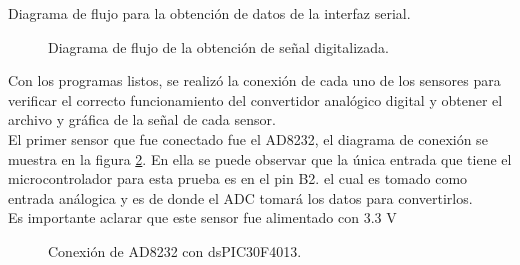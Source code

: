 Diagrama de flujo para la obtención de datos de la interfaz serial.
	\begin{figure}[htbp!]
		\centering
		\caption{Diagrama de flujo de la obtención de señal digitalizada.}
		\label{fig:FlujoSerial}
	\end{figure}
\pagebreak
		
Con los programas listos, se realizó la conexión de cada uno de los sensores para verificar el  correcto funcionamiento del convertidor analógico digital y obtener el archivo y gráfica de la señal de cada sensor.\\

El primer sensor que fue conectado fue el AD8232, el diagrama de conexión se muestra en la figura \ref{fig:ConexionAD8232}. En ella se puede observar que la única entrada que tiene el microcontrolador para esta prueba es en el pin B2. el cual es tomado como entrada análogica y es de donde el ADC tomará los datos para convertirlos.\\

Es importante aclarar que este sensor fue alimentado con 3.3 V

	\begin{figure}[htbp!]
		\centering
		\caption{Conexión de AD8232 con dsPIC30F4013.}
		\label{fig:ConexionAD8232}
	\end{figure}
	
